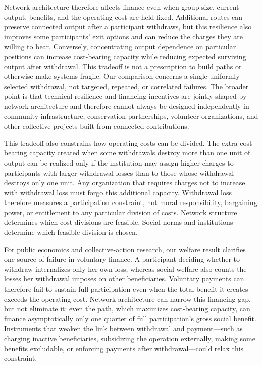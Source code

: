 \documentclass[preprint,12pt,authoryear]{elsarticle}
\begin{document}
Network architecture therefore affects finance even when group size, current output,
benefits, and the operating cost are held fixed. Additional routes can
preserve connected output after a participant withdraws, but this resilience
also improves some participants' exit options and can reduce the charges they
are willing to bear. Conversely, concentrating output dependence on particular
positions can increase cost-bearing capacity while reducing expected surviving
output after withdrawal. This tradeoff is not a prescription to build paths or
otherwise make systems fragile. Our comparison concerns a single uniformly
selected withdrawal, not targeted, repeated, or correlated failures. The broader
point is that technical resilience and financing incentives are jointly shaped
by network architecture and therefore cannot always be designed independently
in community infrastructure, conservation partnerships, volunteer
organizations, and other collective projects built from connected
contributions.

This tradeoff also constrains how operating costs can be divided. The extra
cost-bearing capacity created when some withdrawals destroy more than one unit
of output can be realized only if the institution may assign higher charges to
participants with larger withdrawal losses than to those whose withdrawal
destroys only one unit. Any organization that requires charges not to increase
with withdrawal loss must forgo this additional capacity. Withdrawal loss
therefore measures a participation constraint, not moral responsibility,
bargaining power, or entitlement to any particular division of costs. Network
structure determines which cost divisions are feasible. Social norms and
institutions determine which feasible division is chosen.

For public economics and collective-action research, our welfare result
clarifies one source of failure in voluntary finance. A participant deciding
whether to withdraw internalizes only her own loss, whereas social welfare also
counts the losses her withdrawal imposes on other beneficiaries. Voluntary
payments can therefore fail to sustain full participation even when the total
benefit it creates exceeds the operating cost. Network architecture can narrow
this financing gap, but not eliminate it: even the path, which maximizes
cost-bearing capacity, can finance asymptotically only one quarter of full
participation's gross social benefit. Instruments that weaken the link between
withdrawal and payment---such as charging inactive beneficiaries, subsidizing
the operation externally, making some benefits excludable, or enforcing
payments after withdrawal---could relax this constraint. 
\end{document}
